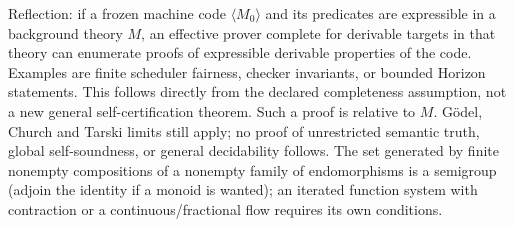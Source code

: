 \documentclass[11pt]{article}
\theoremstyle{definition}\newtheorem{definition}[theorem]{Definition}\newtheorem{example}[theorem]{Example}\newtheorem{conjecture}[theorem]{Conjecture}
\begin{document}
Reflection: if a frozen machine code $\langle M_0\rangle$ and its predicates are expressible in a background theory $M$, an effective prover complete for derivable targets in that theory can enumerate proofs of expressible derivable properties of the code. Examples are finite scheduler fairness, checker invariants, or bounded Horizon statements. This follows directly from the declared completeness assumption, not a new general self-certification theorem. Such a proof is relative to $M$. G\"odel, Church and Tarski limits still apply; no proof of unrestricted semantic truth, global self-soundness, or general decidability follows. The set generated by finite nonempty compositions of a nonempty family of endomorphisms is a semigroup (adjoin the identity if a monoid is wanted); an iterated function system with contraction or a continuous/fractional flow requires its own conditions.
\end{document}
